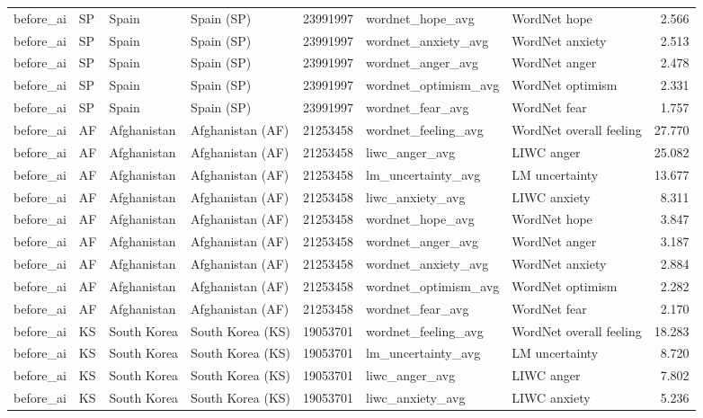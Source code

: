 \begin{tabular}{llllrllr}
before\_ai & SP & Spain & Spain (SP) & 23991997 & wordnet\_hope\_avg & WordNet hope & 2.566 \\
before\_ai & SP & Spain & Spain (SP) & 23991997 & wordnet\_anxiety\_avg & WordNet anxiety & 2.513 \\
before\_ai & SP & Spain & Spain (SP) & 23991997 & wordnet\_anger\_avg & WordNet anger & 2.478 \\
before\_ai & SP & Spain & Spain (SP) & 23991997 & wordnet\_optimism\_avg & WordNet optimism & 2.331 \\
before\_ai & SP & Spain & Spain (SP) & 23991997 & wordnet\_fear\_avg & WordNet fear & 1.757 \\
before\_ai & AF & Afghanistan & Afghanistan (AF) & 21253458 & wordnet\_feeling\_avg & WordNet overall feeling & 27.770 \\
before\_ai & AF & Afghanistan & Afghanistan (AF) & 21253458 & liwc\_anger\_avg & LIWC anger & 25.082 \\
before\_ai & AF & Afghanistan & Afghanistan (AF) & 21253458 & lm\_uncertainty\_avg & LM uncertainty & 13.677 \\
before\_ai & AF & Afghanistan & Afghanistan (AF) & 21253458 & liwc\_anxiety\_avg & LIWC anxiety & 8.311 \\
before\_ai & AF & Afghanistan & Afghanistan (AF) & 21253458 & wordnet\_hope\_avg & WordNet hope & 3.847 \\
before\_ai & AF & Afghanistan & Afghanistan (AF) & 21253458 & wordnet\_anger\_avg & WordNet anger & 3.187 \\
before\_ai & AF & Afghanistan & Afghanistan (AF) & 21253458 & wordnet\_anxiety\_avg & WordNet anxiety & 2.884 \\
before\_ai & AF & Afghanistan & Afghanistan (AF) & 21253458 & wordnet\_optimism\_avg & WordNet optimism & 2.282 \\
before\_ai & AF & Afghanistan & Afghanistan (AF) & 21253458 & wordnet\_fear\_avg & WordNet fear & 2.170 \\
before\_ai & KS & South Korea & South Korea (KS) & 19053701 & wordnet\_feeling\_avg & WordNet overall feeling & 18.283 \\
before\_ai & KS & South Korea & South Korea (KS) & 19053701 & lm\_uncertainty\_avg & LM uncertainty & 8.720 \\
before\_ai & KS & South Korea & South Korea (KS) & 19053701 & liwc\_anger\_avg & LIWC anger & 7.802 \\
before\_ai & KS & South Korea & South Korea (KS) & 19053701 & liwc\_anxiety\_avg & LIWC anxiety & 5.236 \\

\end{tabular}
